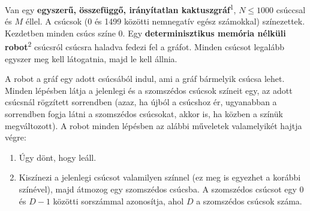 \documentclass[12pt]{article}
\begin{document}
\renewcommand{\round}{Day 2}
\renewcommand{\problemName}{Task Navigation}
\renewcommand{\lang}{Hungarian [HUN]}

\renewcommand{\tl}{$3$ sec.}
\renewcommand{\ml}{$512$ MB}

Van egy \textbf{egyszerű, összefüggő, irányítatlan kaktuszgráf}\textsuperscript{1}, $N \leq 1000$ csúccsal és $M$ éllel. A csúcsok (0 és 1499 közötti nemnegatív egész számokkal) színezettek. Kezdetben minden csúcs színe 0. Egy \textbf{determinisztikus memória nélküli robot}\textsuperscript{2} csúcsról csúcsra haladva fedezi fel a gráfot. Minden csúcsot legalább egyszer meg kell látogatnia, majd le kell állnia.

A robot a gráf egy adott csúcsából indul, ami a gráf bármelyik csúcsa lehet. Minden lépésben látja a jelenlegi és a szomszédos csúcsok színeit egy, az adott csúcsnál rögzített sorrendben (azaz, ha újból a csúcshoz ér, ugyanabban a sorrendben fogja látni a szomszédos csúcsokat, akkor is, ha közben a színük megváltozott). A robot minden lépésben az alábbi műveletek valamelyikét hajtja végre:
\begin{enumerate}
    \item Úgy dönt, hogy leáll.
    \item Kiszínezi a jelenlegi csúcsot valamilyen színnel (ez meg is egyezhet a korábbi színével), majd átmozog egy szomszédos csúcsba. A szomszédos csúcsot egy $0$ és $D-1$ közötti sorszámmal azonosítja, ahol $D$ a szomszédos csúcsok száma.
\end{enumerate}
\end{document}
